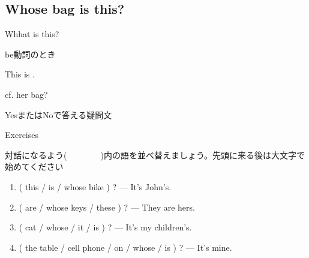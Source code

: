 \documentclass[aspectratio=169,xcolor={dvipsnames,table}]{beamer}
\begin{document}
\subsection{Whose bag is this?}
\begin{frame}[plain]{Whhat is this?} \Large

be動詞のとき

\mbox{}\hspace{55pt}This is .

\pause


\vspace{7pt}

\mbox{}\hfill{}cf.  her bag?%

\vspace{-5pt}

\hfill{\small YesまたはNoで答える疑問文}

\pause


\pause




\end{frame}
\begin{frame}[plain]{Exercises}

対話になるよう(~~~~~~~~)内の語を並べ替えましょう。先頭に来る後は大文字で始めてください
 \begin{enumerate}
  \item ( this / is / whose bike ) ? --- It's John's.
  \item ( are / whose keys / these ) ? --- They are hers. 
  \item ( cat / whose / it / is ) ? --- It's my children's.
  \item ( the table / cell phone / on / whose / is ) ? --- It's mine.
 \end{enumerate}
\end{frame}
\end{document}
